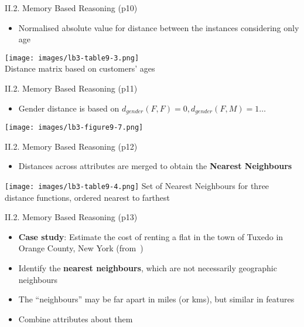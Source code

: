 \documentclass[handout]{beamer}
\newcommand{\strong}[1]{\textbf{\color{teal} #1}}
\begin{document}
\begin{frame}{II.2. Memory Based Reasoning (p10)}
\begin{itemize}
\item Normalised absolute value for distance between the instances considering only age
\end{itemize}
\begin{center}
\texttt{[image: images/lb3-table9-3.png]}\\
Distance matrix based on customers' ages~\cite[Table 9.3]{LB3:2011}
\end{center}
\end{frame}
\begin{frame}{II.2. Memory Based Reasoning (p11)}
\begin{itemize}
\item Gender distance is based on $d_{gender}(F,F)=0, d_{gender}(F,M)=1 \dots $
\end{itemize}
\begin{center}
\texttt{[image: images/lb3-figure9-7.png]}\\
\cite[Figure 9.7]{LB3:2011}
\end{center}
\end{frame}
\begin{frame}{II.2. Memory Based Reasoning (p12)}
\begin{itemize}
\item Distances across attributes are merged to obtain the \strong{Nearest Neighbours}
\end{itemize}
\begin{center}
\texttt{[image: images/lb3-table9-4.png]}
Set of Nearest Neighbours for three distance functions, ordered nearest to farthest~\cite[Table 9.4]{LB3:2011}
\end{center}
\end{frame}
\begin{frame}{II.2. Memory Based Reasoning (p13)}
\begin{itemize}
\item \strong{Case study}: Estimate the cost of renting a flat in the town of Tuxedo in Orange County, New York (from~\cite[ch.9]{LB3:2011})
\item Identify the \strong{nearest neighbours}, which are not necessarily geographic neighbours
\item The ``neighbours'' may be far apart in miles (or kms), but similar in features
\item Combine attributes about them
\end{itemize}
\end{frame}
\end{document}
